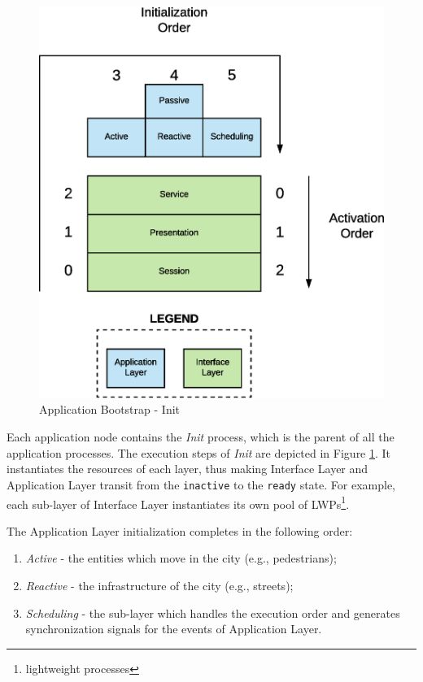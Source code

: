 \begin{figure}[H]
  \centering
  \includegraphics[scale=0.5,keepaspectratio]
    {images/solution/init_activate.eps}
  \caption{Application Bootstrap - Init}
  \label{fig:sd-app-init}
\end{figure}



Each application node contains the \textit{Init} process,
which is the parent of all the application processes.
The execution steps of \textit{Init} are depicted in Figure
\ref{fig:sd-app-init}.
It instantiates the resources of each layer, thus making
Interface Layer and Application Layer transit from the \verb|inactive|
to the \verb|ready| state.
For example, each sub-layer of Interface Layer instantiates its own pool of
LWPs\footnote{lightweight processes}.

The Application Layer initialization completes in the following order:

\begin{enumerate}
  \item \textit{Active} - the entities which move in the city (e.g.,
    pedestrians);
  \item \textit{Reactive} - the infrastructure of the city (e.g., streets);
  \item \textit{Scheduling} - the sub-layer which handles the execution order
    and generates synchronization signals for the events of Application Layer.
\end{enumerate}

